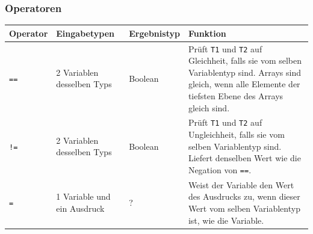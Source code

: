 \documentclass[a4paper,10pt]{article}
\begin{document}
\subsubsection{Operatoren}
\begin{tabularx}{\textwidth}{| l | X | l | X |}
\hline
\textbf{Operator} & \textbf{Eingabetypen} & \textbf{Ergebnistyp} & \textbf{Funktion}\\
\hline
\texttt{==} & 2 Variablen desselben Typs & Boolean & Pr\"{u}ft \texttt{T1} und \texttt{T2} auf Gleichheit, falls sie vom selben Variablentyp sind. Arrays sind gleich, wenn alle Elemente der tiefsten Ebene des Arrays gleich sind.\\
\texttt{!=} & 2 Variablen desselben Typs & Boolean & Pr\"{u}ft \texttt{T1} und \texttt{T2} auf Ungleichheit, falls sie vom selben Variablentyp sind. Liefert denselben Wert wie die Negation von \texttt{==}.\\
\texttt{=} & 1 Variable und ein Ausdruck & ? & Weist der Variable den Wert des Ausdrucks zu, wenn dieser Wert vom selben Variablentyp ist, wie die Variable.\\
\hline
\end{tabularx}
\clearpage
\end{document}
